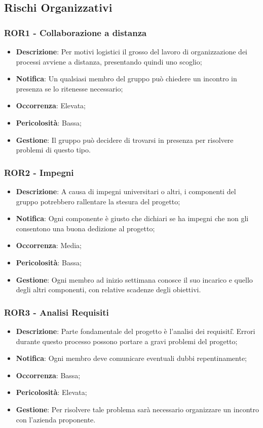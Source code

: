    \subsection{Rischi Organizzativi}

	\subsubsection*{ROR1 - Collaborazione a distanza}
	\begin{itemize}
		\item \textbf{Descrizione}: Per motivi logistici il grosso del lavoro di organizzazione dei processi avviene a distanza, presentando quindi uno scoglio;
		\item \textbf{Notifica}: Un qualsiasi membro del gruppo può chiedere un incontro in presenza se lo ritenesse necessario;
		\item \textbf{Occorrenza}: Elevata;
		\item \textbf{Pericolosità}: Bassa;
		\item \textbf{Gestione}: Il gruppo può decidere di trovarsi in presenza per risolvere problemi di questo tipo.
	\end{itemize}

	\subsubsection*{ROR2 - Impegni}
	\begin{itemize}
		\item \textbf{Descrizione}: A causa di impegni universitari o altri, i componenti del gruppo potrebbero rallentare la stesura del progetto;
		\item \textbf{Notifica}: Ogni componente è giusto che dichiari se ha  impegni che non gli consentono una buona dedizione al progetto;
		\item \textbf{Occorrenza}: Media;
		\item \textbf{Pericolosità}: Bassa;
		\item \textbf{Gestione}: Ogni membro ad inizio settimana conosce il suo incarico e quello degli altri componenti, con relative scadenze degli obiettivi.
	\end{itemize}

	\subsubsection*{ROR3 - Analisi Requisiti}
	\begin{itemize}
		\item \textbf{Descrizione}: Parte fondamentale del progetto è l'analisi dei requisiti\G. Errori durante questo processo possono portare a gravi problemi del progetto;
		\item \textbf{Notifica}: Ogni membro deve comunicare eventuali dubbi repentinamente;
		\item \textbf{Occorrenza}: Bassa;
		\item \textbf{Pericolosità}: Elevata;
		\item \textbf{Gestione}: Per risolvere tale problema sarà necessario organizzare un incontro con l'azienda proponente.
	\end{itemize}

